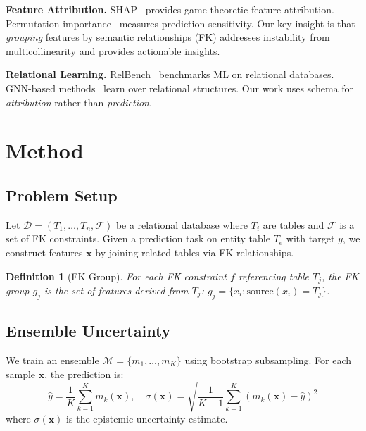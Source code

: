 \documentclass{article}
\newtheorem{definition}{Definition}
\begin{document}
\textbf{Feature Attribution.}
SHAP~\citep{lundberg2017unified} provides game-theoretic feature attribution.
Permutation importance~\citep{breiman2001random} measures prediction sensitivity.
Our key insight is that \emph{grouping} features by semantic relationships (FK)
addresses instability from multicollinearity and provides actionable insights.

\textbf{Relational Learning.}
RelBench~\citep{fey2024relbench} benchmarks ML on relational databases.
GNN-based methods~\citep{schlichtkrull2018modeling} learn over relational structures.
Our work uses schema for \emph{attribution} rather than \emph{prediction}.

\section{Method}
\label{sec:method}

\subsection{Problem Setup}

Let $\mathcal{D} = (T_1, \ldots, T_n, \mathcal{F})$ be a relational database where
$T_i$ are tables and $\mathcal{F}$ is a set of FK constraints. Given a prediction
task on entity table $T_e$ with target $y$, we construct features $\mathbf{x}$ by
joining related tables via FK relationships.

\begin{definition}[FK Group]
For each FK constraint $f$ referencing table $T_j$, the FK group $g_j$ is the set
of features derived from $T_j$: $g_j = \{x_i : \text{source}(x_i) = T_j\}$.
\end{definition}

\subsection{Ensemble Uncertainty}

We train an ensemble $\mathcal{M} = \{m_1, \ldots, m_K\}$ using bootstrap subsampling.
For each sample $\mathbf{x}$, the prediction is:
\begin{equation}
\hat{y} = \frac{1}{K} \sum_{k=1}^K m_k(\mathbf{x}), \quad
\sigma(\mathbf{x}) = \sqrt{\frac{1}{K-1} \sum_{k=1}^K (m_k(\mathbf{x}) - \hat{y})^2}
\end{equation}
where $\sigma(\mathbf{x})$ is the epistemic uncertainty estimate.
\end{document}
